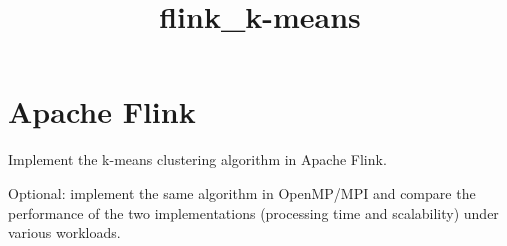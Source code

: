 \documentclass[11pt]{article}
\title{flink\_k-means}
\begin{document}
    
    
    \maketitle
    
    

    
    \hypertarget{apache-flink}{%
\section{Apache Flink}\label{apache-flink}}

Implement the k-means clustering algorithm in Apache Flink.

Optional: implement the same algorithm in OpenMP/MPI and compare the
performance of the two implementations (processing time and scalability)
under various workloads.
\end{document}
